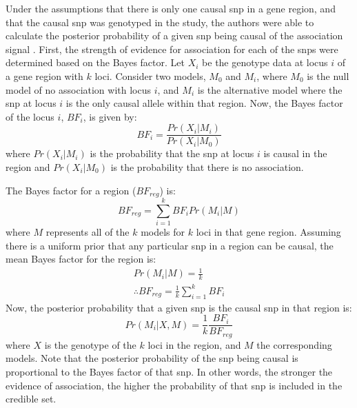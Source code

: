 Under the assumptions that there is only one causal \gls{snp} in a gene region, and that the causal \gls{snp} was genotyped in the study, the authors were able to calculate the posterior probability of a given \gls{snp} being causal of the association signal \citep{wtccc2012}.
First, the strength of evidence for association for each of the \glspl{snp} were determined based on the Bayes factor.
Let $X_i$ be the genotype data at locus $i$ of a gene region with $k$ loci.
Consider two models, $M_0$ and $M_i$, where $M_0$ is the null model of no association with locus $i$, and $M_i$ is the alternative model where the \gls{snp} at locus $i$ is the only causal allele within that region.
Now, the Bayes factor of the locus $i$, $BF_i$, is given by:
\begin{equation*}
	BF_i = \frac{Pr(X_i|M_i)}{Pr(X_i|M_0)}
\end{equation*}
where $Pr(X_i|M_i)$ is the probability that the \gls{snp} at locus $i$ is causal in the region and $Pr(X_i|M_0)$ is the probability that there is no association.

The Bayes factor for a region ($BF_{reg}$) is:
\begin{equation*}
	BF_{reg} = \sum^{k}_{i = 1}BF_iPr(M_i|M)
\end{equation*}
where $M$ represents all of the $k$ models for $k$ loci in that gene region.
Assuming there is a uniform prior that any particular \gls{snp} in a region can be causal, the mean Bayes factor for the region is:
\begin{align*}
	Pr(M_i|M) = \frac{1}{k}\\
	\therefore BF_{reg} = \frac{1}{k}\sum_{i = 1}^{k}BF_i
\end{align*}
Now, the posterior probability that a given \gls{snp} is the causal \gls{snp} in that region is:
\begin{equation*}
	Pr(M_i|X,M) = \frac{1}{k}\frac{BF_i}{BF_{reg}}
\end{equation*}
where $X$ is the genotype of the $k$ loci in the region, and $M$ the corresponding models.
Note that the posterior probability of the \gls{snp} being causal is proportional to the Bayes factor of that \gls{snp}.
In other words, the stronger the evidence of association, the higher the probability of that \gls{snp} is included in the credible set.

